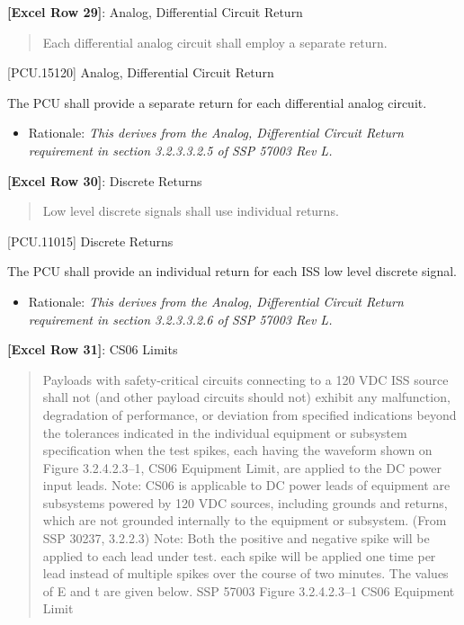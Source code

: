 \textbf{[Excel Row 29]}: Analog, Differential Circuit Return

\begin{quote}
Each differential analog circuit shall employ a separate return.
\end{quote}

[PCU.15120] Analog, Differential Circuit Return

The PCU shall provide a separate return for each differential analog circuit.

\begin{itemize}
\item{} Rationale: \emph{This derives from the Analog, Differential Circuit Return requirement in section 3.2.3.3.2.5 of SSP 57003 Rev L.}

\end{itemize}

\textbf{[Excel Row 30]}: Discrete Returns

\begin{quote}
Low level discrete signals shall use individual returns.
\end{quote}

[PCU.11015] Discrete Returns

The PCU shall provide an individual return for each ISS low level discrete signal.

\begin{itemize}
\item{} Rationale: \emph{This derives from the Analog, Differential Circuit Return requirement in section 3.2.3.3.2.6 of SSP 57003 Rev L.}

\end{itemize}

\textbf{[Excel Row 31]}: CS06 Limits

\begin{quote}
Payloads with safety-critical circuits connecting to a 120 VDC ISS source shall not (and other payload circuits should not) exhibit any malfunction, degradation of performance, or deviation from specified indications beyond the tolerances indicated in the individual equipment or subsystem specification when the test spikes, each having the waveform shown on Figure 3.2.4.2.3--1, CS06 Equipment Limit, are applied to the DC power input leads.
Note: CS06 is applicable to DC power leads of equipment are subsystems powered by 120 VDC sources, including grounds and returns, which are not grounded internally to the equipment or subsystem. (From SSP 30237, 3.2.2.3)
Note: Both the positive and negative spike will be applied to each lead under test. each spike will be applied one time per lead instead of multiple spikes over the course of two minutes. The values of E and t are given below.
SSP 57003 Figure 3.2.4.2.3--1 CS06 Equipment Limit
\end{quote}

